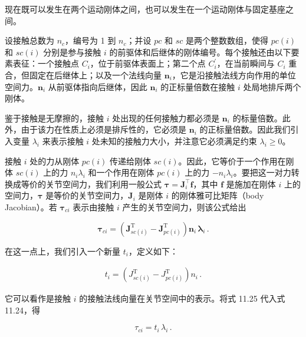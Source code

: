 \documentclass[10pt,a4paper]{book}
\theoremstyle{thmstyle} %
\theoremstyle{defstyle} %
\theoremstyle{prostyle} %
\begin{document}
现在既可以发生在两个运动刚体之间，也可以发生在一个运动刚体与固定基座之间。



设接触总数为 $n_{c}$，编号为 1 到 $n_{c}$；并设 $pc$ 和 $sc$ 是两个整数数组，使得 $pc(i)$ 和 $sc(i)$ 分别是参与接触 $i$ 的前驱体和后继体的刚体编号。每个接触还由以下要素表征：一个接触点 $C_{i}$，位于前驱体表面上；第二个点 $C_{i}^{\prime}$，在当前瞬间与 $C_{i}$ 重合，但固定在后继体上；以及一个法线向量 $\boldsymbol{n}_{i}$，它是沿接触法线方向作用的单位空间力。$\boldsymbol{n}_{i}$ 从前驱体指向后继体，因此 $\boldsymbol{n}_{i}$ 的正标量倍数在接触 $i$ 处局地排斥两个刚体。



鉴于接触是无摩擦的，接触 $i$ 处出现的任何接触力都必须是 $\boldsymbol{n}_{i}$ 的标量倍数。此外，由于该力在性质上必须是排斥性的，它必须是 $\boldsymbol{n}_{i}$ 的正标量倍数。因此我们引入变量 $\lambda_{i}$ 来表示接触 $i$ 处未知的接触力大小，并注意它必须满足约束 $\lambda_{i} \geq 0$。



接触 $i$ 处的力从刚体 $pc(i)$ 传递给刚体 $sc(i)$。因此，它等价于一个作用在刚体 $sc(i)$ 上的力 $n_i\lambda_i$ 和一个作用在刚体 $pc(i)$ 上的力 $-n_i\lambda_i$。要把这一对力转换成等价的关节空间力，我们利用一般公式 $\boldsymbol{\tau}=\boldsymbol{J}_i^\top\boldsymbol{f}$，其中 $\boldsymbol{f}$ 是施加在刚体 $i$ 上的空间力，$\boldsymbol{\tau}$ 是等价的关节空间力，$\boldsymbol{J}_i$ 是刚体 $i$ 的刚体雅可比矩阵（body Jacobian）。若 $\boldsymbol{\tau}_{ci}$ 表示由接触 $i$ 产生的关节空间力，则该公式给出



$$
\boldsymbol { \tau } _ { c i } = \left( \boldsymbol { J } _ { s c ( i ) } ^{\mathrm { T} } - \boldsymbol { J } _ { p c ( i ) } ^{\mathrm { T} } \right) \boldsymbol { n } _ { i } \, \boldsymbol { \lambda } _ { i } \, .
$$



在这一点上，我们引入一个新量 $t_{i}$，定义如下：



$$
\begin{array}{r} { t _ { i } = \left( J _ { s c ( i ) } ^{\mathrm { T} } - J _ { p c ( i ) } ^{\mathrm { T} } \right) n _ { i } \, . } \end{array}
$$



它可以看作是接触 $i$ 的接触法线向量在关节空间中的表示。将式 11.25 代入式 11.24，得



$$
\tau _ { c i } = t _ { i } \, \lambda _ { i } \, .
$$
\end{document}
